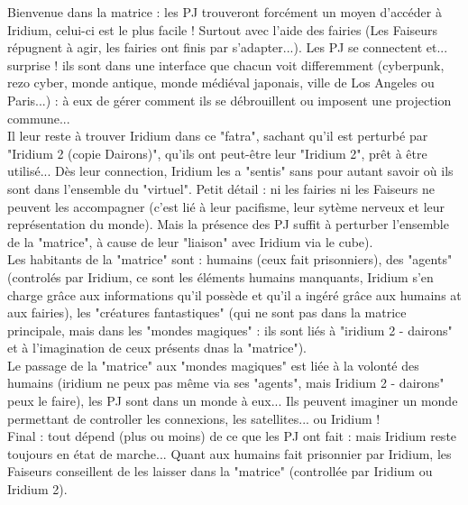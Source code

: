 \documentclass[11pt,twoside,a4paper]{book}
\begin{document}
Bienvenue dans la matrice : les PJ trouveront forc{\'e}ment un moyen d'acc{\'e}der {\`a} Iridium, celui-ci est le plus facile ! Surtout avec l'aide des fairies (Les Faiseurs r{\'e}pugnent {\`a} agir, les fairies ont finis par s'adapter...). Les PJ se connectent et... surprise ! ils sont dans une interface que chacun voit differemment (cyberpunk, rezo cyber, monde antique, monde m{\'e}di{\'e}val japonais, ville de Los Angeles ou Paris...) : {\`a} eux de g{\'e}rer comment ils se d{\'e}brouillent ou imposent une projection commune... ~\\
Il leur reste {\`a} trouver Iridium dans ce "fatra", sachant qu'il est perturb{\'e} par "Iridium 2 (copie Dairons)", qu'ils ont peut-{\^e}tre leur "Iridium 2", pr{\^e}t {\`a} {\^e}tre utilis{\'e}... D{\`e}s leur connection, Iridium les a "sentis" sans pour autant savoir o{\`u} ils sont dans l'ensemble du "virtuel". Petit d{\'e}tail : ni les fairies ni les Faiseurs ne peuvent les accompagner (c'est li{\'e} {\`a} leur pacifisme, leur syt{\`e}me nerveux et leur repr{\'e}sentation du monde). Mais la pr{\'e}sence des PJ suffit {\`a} perturber l'ensemble de la "matrice", {\`a} cause de leur "liaison" avec Iridium via le cube). ~\\
Les habitants de la "matrice" sont : humains (ceux fait prisonniers), des "agents" (control{\'e}s par Iridium, ce sont les {\'e}l{\'e}ments humains manquants, Iridium s'en charge gr{\^a}ce aux informations qu'il poss{\`e}de et qu'il a ing{\'e}r{\'e} gr{\^a}ce aux humains at aux fairies), les "cr{\'e}atures fantastiques" (qui ne sont pas dans la matrice principale, mais dans les "mondes magiques" : ils sont li{\'e}s {\`a} "iridium 2 - dairons" et {\`a} l'imagination de ceux pr{\'e}sents dnas la "matrice"). ~\\
Le passage de la "matrice" aux "mondes magiques" est li{\'e}e {\`a} la volont{\'e} des humains (iridium ne peux pas m{\^e}me via ses "agents", mais Iridium 2 - dairons" peux le faire), les PJ sont dans un monde {\`a} eux... Ils peuvent imaginer un monde permettant de controller les connexions, les satellites... ou Iridium ! ~\\

Final : tout d{\'e}pend (plus ou moins) de ce que les PJ ont fait : mais Iridium reste toujours en {\'e}tat de marche... Quant aux humains fait prisonnier par Iridium, les Faiseurs conseillent de les laisser dans la "matrice" (controll{\'e}e par Iridium ou Iridium 2). ~\\
\end{document}
